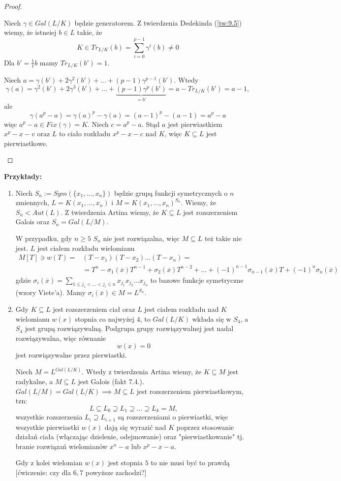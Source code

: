 \begin{proof}
\begin{itemize}
    Niech $\gamma\in Gal(L/K)$ będzie generatorem. Z twierdzenia Dedekinda (\ref{tw:9.5}) wiemy, że istneiej $b\in L$ takie, że
    $$K\in Tr_{L/K}(b)=\sum\limits_{i=0}^{p-1}\gamma^{i}(b)\neq 0$$
    Dla $b'=\frac{1}{t}b$ mamy $Tr_{L/K}(b')=1$.

    Niech $a=\gamma(b')+2\gamma^2(b')+...+(p-1)\gamma^{p-1}(b')$. Wtedy 
    $$\gamma(a)=\gamma^2(b')+2\gamma^3(b')+...+\underbrace{(p-1)\gamma^p(b')}_{=b'}=a-Tr_{L/K}(b')=a-1,$$
    ale 
    $$\gamma(a^p-a)=\gamma(a)^p-\gamma(a)=(a-1)^p-(a-1)=a^p-a$$
    więc $a^p-a\in Fix(\gamma)=K$. Niech $c=a^p-a$. Stąd $a$ jest pierwiastkiem $x^p-x-v$ oraz $L$ to ciało rozkładu $x^p-x-c$ nad $K$, więc $K\subseteq L$ jest pierwiastkowe.
\end{itemize}
\end{proof}

\textbf{Przykłady:}
\begin{enumerate}[leftmargin=*]
    \item Niech $S_n:= Sym(\{x_1,...,x_n\})$ będzie grupą funkcji symetrycznych o $n$ zmiennych, $L=K(x_1,...,x_n)$ i $M=K(x_1,...,x_n)^{S_n}$. Wiemy, że $S_n<Aut(L)$. Z twierdzenia Artina wiemy, że $K\subseteq L$ jest rozszerzeniem Galois oraz $S_n=Gal(L/M)$.

    W przypadku, gdy $n\geq5$ $S_n$ nie jest rozwiązalna, więc $M\subseteq L$ też takie nie jest. $L$ jest ciałem rozkładu wielomianu
    \begin{align*}
    M[T]\ni w(T)=&(T-x_1)(T-x_2)...(T-x_n)=\\
    &=T^n-\sigma_1(\overline{x})T^{n-1}+\sigma_2(\overline{x})T^{n-2}+...+(-1)^{n-1}\sigma_{n-1}(\overline{x})T+(-1)^n\sigma_n(\overline{x})
    \end{align*}
    gdzie $\sigma_i(\overline{x})=\sum_{1\leq j_1<...<j_i\leq n}x_{j_1}x_{j_2}...x_{j_n}$ to bazowe funkcje symetryczne (wzory Viete'a). Mamy $\sigma_i(\overline{x})\in M=L^{S_n}$.
    \item Gdy $K\subseteq L$ jest rozszerzeniem ciał oraz $L$ jest ciałem rozkładu nad $K$ wielomianu $w(x)$ stopnia co najwyżej $4$, to $Gal(L/K)$ wkłada się w $S_4$, a $S_4$ jest grupą rozwiązywalną. Podgrupa grupy rozwiązywalnej jest nadal rozwiązywalna, więc równanie
    $$w(x)=0$$
    jest rozwiązywalne przez pierwiastki.

    Niech $M=L^{Gal(L/K)}$. Wtedy z twierdzenia Artina wiemy, że $K\subseteq M$ jest radykalne, a $M\subseteq L$ jest Galois (fakt 7.4.). $Gal(L/M)=Gal(L/K)\implies M\subseteq L$ jest rozszerzeniem pierwiastkowym, tzn:
    $$L\subseteq L_0\supseteq L_1\supseteq ...\supseteq L_k=M,$$
    wszystkie rozszerzenia $L_i\supseteq L_{i+1}$ są rozszerzeniami o pierwiastki, więc wszystkie pierwiastki $w(x)$ dają się wyrazić nad $K$ poprzez stosowanie działań ciała (włączając dzielenie, odejmowanie) oraz "pierwiastkowanie" tj. branie rozwiązań wielomianów $x^n-a$ lub $x^p-x-a$.

    Gdy z kolei wielomian $w(x)$ jest stopnia $5$ to nie musi być to prawdą [ćwiczenie: czy dla $6,7$ powyższe zachodzi?]
\end{enumerate}

